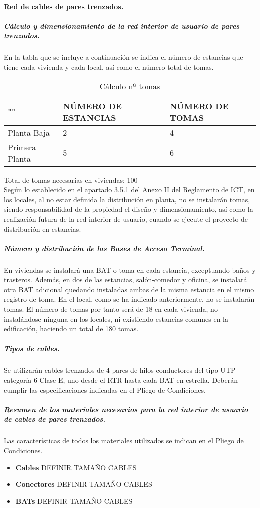 \paragraph{Red de cables de pares trenzados.}
\subparagraph{Cálculo y dimensionamiento de la red interior de usuario de pares trenzados.}
En la tabla que se incluye a continuación se indica el número de estancias que tiene cada
vivienda y cada local, así como el número total de tomas.
\begin{table}[H]
\centering
\begin{tabular}{p{5cm} p{5cm} p{5cm}}
\hline
""&NÚMERO DE ESTANCIAS&NÚMERO DE TOMAS\\
\hline \hline
Planta Baja&2&4\\
\hline
Primera Planta&5&6\\
\end{tabular}
\caption{Cálculo nº tomas}
\label{tabla:autores}
\end{table}
Total de tomas necesarias en viviendas: 100\\
Según lo establecido en el apartado 3.5.1 del Anexo II del Reglamento de ICT, en los locales, al
no estar definida la distribución en planta, no se instalarán tomas, siendo responsabilidad de la
propiedad el diseño y dimensionamiento, así como la realización futura de la red interior de
usuario, cuando se ejecute el proyecto de distribución en estancias.
\subparagraph{Número y distribución de las Bases de Acceso Terminal.}
En viviendas se instalará una BAT o toma en cada estancia, exceptuando baños y trasteros.
Además, en dos de las estancias, salón-comedor y oficina, se instalará otra BAT adicional
quedando instaladas ambas de la misma estancia en el mismo registro de toma.
En el local, como se ha indicado anteriormente, no se instalarán tomas.
El número de tomas por tanto será de 18 en cada vivienda, no instalándose ninguna en los locales,
ni existiendo estancias comunes en la edificación, haciendo un total de 180 tomas.
\subparagraph{Tipos de cables.}
Se utilizarán cables trenzados de 4 pares de hilos conductores del tipo UTP categoría 6 Clase E,
uno desde el RTR hasta cada BAT en estrella.
Deberán cumplir las especificaciones indicadas en el Pliego de
Condiciones.
\subparagraph{Resumen de los materiales necesarios para la red interior de usuario de cables de pares trenzados.}
Las características de todos los materiales utilizados se indican en el Pliego de Condiciones.
\begin{itemize}
	\item \textbf{Cables}
	DEFINIR TAMAÑO CABLES
\end{itemize}
\begin{itemize}
	\item \textbf{Conectores}
	DEFINIR TAMAÑO CABLES
\end{itemize}
\begin{itemize}
	\item \textbf{BATs}
	DEFINIR TAMAÑO CABLES
\end{itemize}
